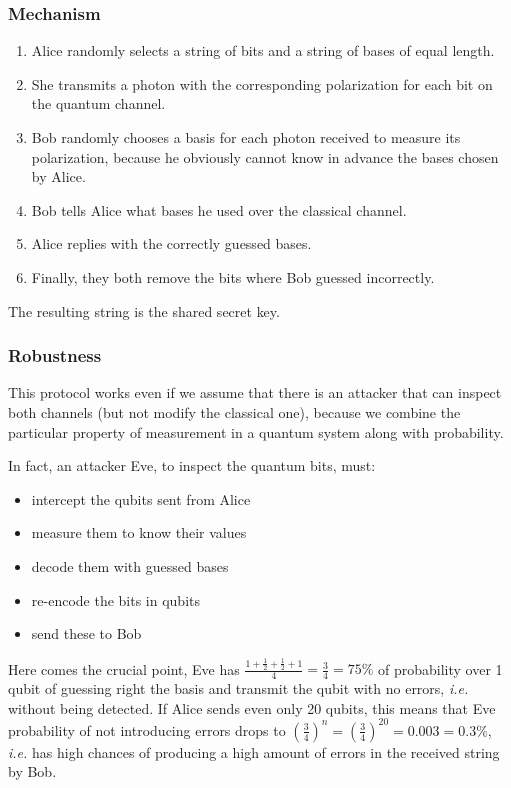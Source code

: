 \documentclass[oneside]{academica}
\begin{document}
\subsubsection{Mechanism}

\begin{enumerate}
  \item Alice randomly selects a string of bits and a string of bases of equal length.
  \item She transmits a photon with the corresponding polarization for each bit on the quantum channel.
  \item Bob randomly chooses a basis for each photon received to measure its polarization, because he obviously cannot know in advance the bases chosen by Alice.
  \item Bob tells Alice what bases he used over the classical channel.
  \item Alice replies with the correctly guessed bases.
  \item Finally, they both remove the bits where Bob guessed incorrectly.
\end{enumerate}
The resulting string is the shared secret key.

\subsubsection{Robustness}

This protocol works even if we assume that there is an attacker that can inspect both channels (but not modify the classical one), because we combine the particular property of measurement in a quantum system along with probability.

In fact, an attacker Eve, to inspect the quantum bits, must:
\begin{itemize}
  \item intercept the qubits sent from Alice
  \item measure them to know their values
  \item decode them with guessed bases
  \item re-encode the bits in qubits 
  \item send these to Bob
\end{itemize}
Here comes the crucial point, Eve has $\displaystyle \frac{1 + \frac{1}{2} + \frac{1}{2} + 1}{4} = \frac{3}{4} = 75\%$ of probability over 1 qubit of guessing right the basis and transmit the qubit with no errors, \textit{i.e.} without being detected.
If Alice sends even only 20 qubits, this means that Eve probability of not introducing errors drops to $\left( \frac{3}{4} \right)^n = \left( \frac{3}{4} \right)^{20} = 0.003 = 0.3\%$, \textit{i.e.} has high chances of producing a high amount of errors in the received string by Bob.
\end{document}
